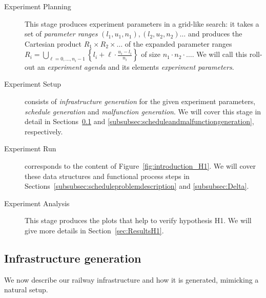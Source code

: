 \documentclass{article}
\begin{document}
\begin{description}
\item[Experiment Planning] This stage produces experiment parameters in a grid-like search: it takes a set of \emph{parameter ranges} $(l_1,u_1,n_1),(l_2,u_2,n_2)\ldots$ and produces the Cartesian product $R_1 \times R_2 \times \ldots$ of the expanded parameter ranges $R_i=\bigcup_{\ell=0,\ldots,n_i-1} \left\{ l_i + \ell \cdot \frac{u_i-l_i}{n_i}\right\}$ of size $n_1 \cdot n_2 \cdot \ldots$. We will call this roll-out an \emph{experiment agenda} and its elements \emph{experiment parameters}.
\item[Experiment Setup] consists of \emph{infrastructure generation} for the given experiment parameters, \emph{schedule generation} and \emph{malfunction generation}. We will cover this stage in detail in Sections~\ref{subsubsec:infrastructuregeneration} and \ref{subsubsec:scheduleandmalfunctiongeneration}, respectively.
\item[Experiment Run] corresponds to the content of Figure~\ref{fig:introduction_H1}. We will cover these data structures and functional process steps in Sections~\ref{subsubsec:scheduleproblemdescription} and \ref{subsubsec:Delta}.
\item[Experiment Analysis] This stage produces the plots that help to verify hypothesis H1. We will give more details in Section~\ref{sec:ResultsH1}.
\end{description}



\subsection{Infrastructure generation}\label{subsubsec:infrastructuregeneration}

We now describe our railway infrastructure and how it is generated, mimicking a natural setup.
\end{document}
